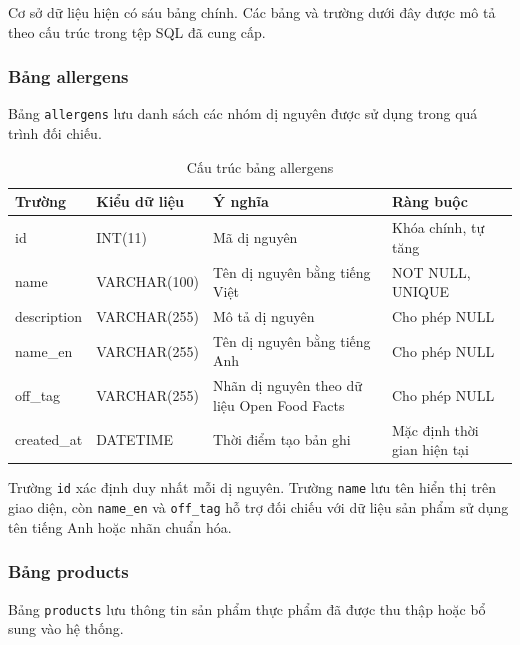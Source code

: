 Cơ sở dữ liệu hiện có sáu bảng chính. Các bảng và trường dưới đây được mô tả theo cấu trúc trong tệp SQL đã cung cấp.

\subsubsection{Bảng allergens}

Bảng \texttt{allergens} lưu danh sách các nhóm dị nguyên được sử dụng trong quá trình đối chiếu.

\begin{table}[H]
	\centering
	\caption{Cấu trúc bảng allergens}
	\label{tab:allergens}
	\small
	\begin{tabularx}{\textwidth}{|l|l|X|l|}
		\hline
		\textbf{Trường} & \textbf{Kiểu dữ liệu} & \textbf{Ý nghĩa} & \textbf{Ràng buộc} \\
		\hline
		id & INT(11) & Mã dị nguyên & Khóa chính, tự tăng \\
		\hline
		name & VARCHAR(100) & Tên dị nguyên bằng tiếng Việt & NOT NULL, UNIQUE \\
		\hline
		description & VARCHAR(255) & Mô tả dị nguyên & Cho phép NULL \\
		\hline
		name\_en & VARCHAR(255) & Tên dị nguyên bằng tiếng Anh & Cho phép NULL \\
		\hline
		off\_tag & VARCHAR(255) & Nhãn dị nguyên theo dữ liệu Open Food Facts & Cho phép NULL \\
		\hline
		created\_at & DATETIME & Thời điểm tạo bản ghi & Mặc định thời gian hiện tại \\
		\hline
	\end{tabularx}
\end{table}

Trường \texttt{id} xác định duy nhất mỗi dị nguyên. Trường \texttt{name} lưu tên hiển thị trên giao diện, còn \texttt{name\_en} và \texttt{off\_tag} hỗ trợ đối chiếu với dữ liệu sản phẩm sử dụng tên tiếng Anh hoặc nhãn chuẩn hóa.

\subsubsection{Bảng products}

Bảng \texttt{products} lưu thông tin sản phẩm thực phẩm đã được thu thập hoặc bổ sung vào hệ thống.

